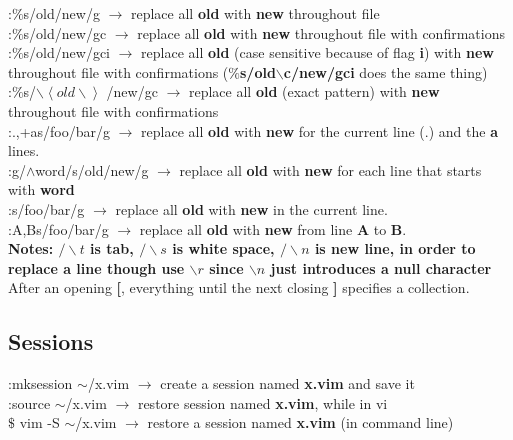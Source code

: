 \documentclass[twoside,a4paper]{article}
\newcommand{\tcc}{\color{cyan}}
\newcommand{\tcr}{\color{red}}
\newcommand{\tcg}{\color{gray}}
\newcommand{\tck}{\color{black}}
\newcommand{\ra }{$\rightarrow$ }
\begin{document}
\begin{multicols}{2}
    \tcr :$\%$s/old/new/g \tck $\rightarrow$
    replace all \textbf{old} with \textbf{new} throughout
    file\\
    \tcr :$\%$s/old/new/gc \tck $\rightarrow$
    replace all \textbf{old} with \textbf{new} throughout
    file with confirmations\\
    \tcr :$\%$s/old/new/gci \tck $\rightarrow$
    replace all \textbf{old} (case sensitive because of flag
    \textbf{i}) with \textbf{new} throughout file with
    confirmations (\textbf{$\%$s/old$\backslash$c/new/gci}
    does the same thing)\\
    \tcr :$\%$s/$\backslash\left< old \backslash
        \right>$
    /new/gc \tck \ra replace all
    \textbf{old} (exact pattern) with \textbf{new}
    throughout file with confirmations\\
    \tcr :.,+as/foo/bar/g \tck $\rightarrow$
    replace all \textbf{old} with \textbf{new} for the
    current line (.) and the \textbf{a} lines.\\
    \tcr :g/$\wedge$word/s/old/new/g \tck
    \ra replace all \textbf{old} with \textbf{new}
    for each line that starts with \textbf{word}\\
    \tcr :s/foo/bar/g \tck \ra
    replace all \textbf{old} with \textbf{new} in the
    current line.\\
    \tcr :A,Bs/foo/bar/g \tck $\rightarrow$
    replace all \textbf{old} with \textbf{new} from line
    \textbf{A} to \textbf{B}.\\
    \tcg \textbf{Notes: $/\backslash t$ is tab,
        $/\backslash s$ is white space, $/\backslash n$ is new
        line, in order to replace a line though use
        $\backslash r$ since $\backslash n$ just introduces a null character}\\
    After an opening \textbf{[}, everything until the next
    closing \textbf{]} specifies a collection.

    \tcc \subsection{Sessions}

    \tcr :mksession $\sim$/x.vim \tck \ra
    create a session named \textbf{x.vim} and save it\\
    \tcr :source $\sim$/x.vim \tck \ra
    restore session named \textbf{x.vim}, while in vi\\
    \tcr $\$ $ vim -S $\sim$/x.vim \tck $\rightarrow$
    restore a session named \textbf{x.vim} (in command line)


\end{multicols}
\end{document}
